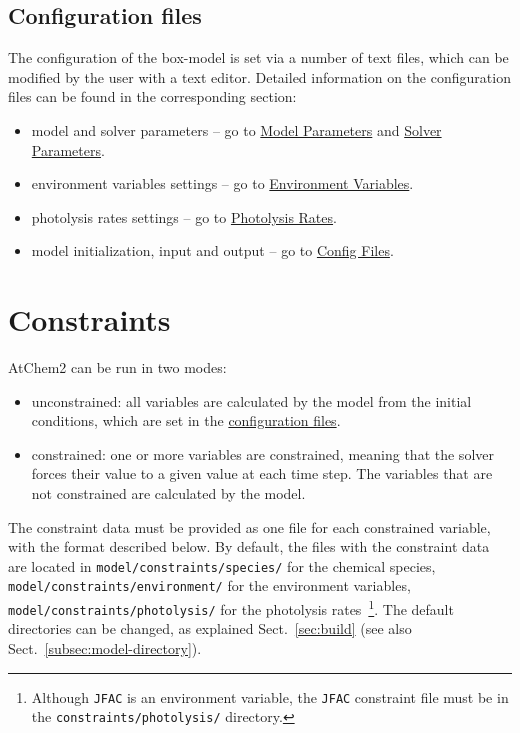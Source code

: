 \subsection{Configuration files} \label{subsec:configuration-files}

The configuration of the box-model is set via a number of text files,
which can be modified by the user with a text editor. Detailed
information on the configuration files can be found in the
corresponding section:

\begin{itemize}
\item model and solver parameters -- go to
  \hyperref[sec:model-parameters]{Model Parameters} and
  \hyperref[sec:solver-parameters]{Solver Parameters}.
\item environment variables settings -- go to
  \hyperref[sec:environment-variables]{Environment Variables}.
\item photolysis rates settings -- go to
  \hyperref[sec:photolysis-rates]{Photolysis Rates}.
\item model initialization, input and output -- go to
  \hyperref[sec:config-files]{Config Files}.
\end{itemize}

\section{Constraints} \label{sec:constraints}

AtChem2 can be run in two modes:

\begin{itemize}
\item unconstrained: all variables are calculated by the model from
  the initial conditions, which are set in the
  \hyperref[subsec:configuration-files]{configuration files}.
\item constrained: one or more variables are constrained, meaning that
  the solver forces their value to a given value at each time
  step. The variables that are not constrained are calculated by the
  model.
\end{itemize}

The constraint data must be provided as one file for each constrained
variable, with the format described below. By default, the files with
the constraint data are located in \texttt{model/constraints/species/}
for the chemical species, \texttt{model/constraints/environment/} for
the environment variables, \texttt{model/constraints/photolysis/} for
the photolysis rates~\footnote{Although \texttt{JFAC} is an
  environment variable, the \texttt{JFAC} constraint file must be in
  the \texttt{constraints/photolysis/} directory.}. The default
directories can be changed, as explained Sect.~\ref{sec:build} (see
also Sect.~\ref{subsec:model-directory}).

